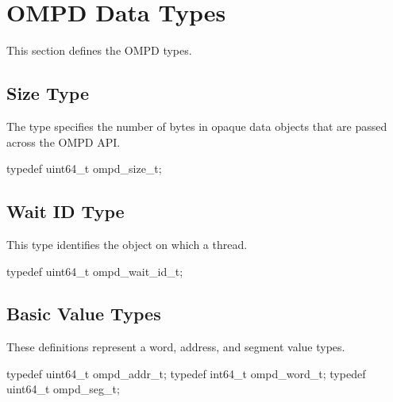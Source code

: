 
\section{OMPD Data Types}
\label{subsec:ompd-data-types}

This section defines the OMPD types.

\subsection{Size Type}
\label{subsubsubsec:ompd_size_t}

\summary
The  type specifies the number of bytes in opaque 
data objects that are passed across the OMPD API.

\format
\begin{ccppspecific}
\begin{ompSyntax}
typedef uint64_t ompd_size_t;
\end{ompSyntax}
\end{ccppspecific}



\subsection{Wait ID Type}
\label{subsubsubsec:ompd_wait_id_t}

\summary
This  type identifies the object on which a thread.

\format
\begin{ccppspecific}
\begin{ompSyntax}
typedef uint64_t ompd_wait_id_t;
\end{ompSyntax}
\end{ccppspecific}



\subsection{Basic Value Types}
\label{subsubsubsec:ompd_addr_t}
\label{subsubsubsec:ompd_word_t}
\label{subsubsubsec:ompd_seg_t}

\summary
These definitions represent a word, address, and segment value types.

\format

\begin{ccppspecific}
\begin{ompSyntax}
typedef uint64_t ompd_addr_t;
typedef int64_t  ompd_word_t;
typedef uint64_t ompd_seg_t;
\end{ompSyntax}
\end{ccppspecific}

